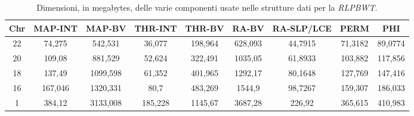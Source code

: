 \begin{table}
  \centering
  \caption{Dimensioni, in megabytes, delle varie componenti usate nelle
    strutture dati per la \textit{RLPBWT}.} 
  \label{tab:comp}
  \scriptsize
  \begin{tabular}{c||c|c|c|c|c|c|c|c}
    \hline
     Chr & MAP-INT & MAP-BV & THR-INT & THR-BV & RA-BV & RA-SLP/LCE & PERM & PHI \\ \hline
        22 & 74,275 & 542,531 & 36,077 & 198,964 & 628,093 & 44,7915 & 71,3182 & 89,0774 \\ \hline
        20 & 109,08 & 881,529 & 52,624 & 322,491 & 1035,05 & 61,8933 & 103,882 & 117,856 \\ \hline
        18 & 137,49 & 1099,598 & 61,352 & 401,965 & 1292,17 & 80,1648 & 127,769 & 147,416 \\ \hline
        16 & 167,046 & 1320,331 & 80,7 & 483,269 & 1544,9 & 98,7267 & 159,307 & 186,033 \\ \hline
        1 & 384,12 & 3133,008 & 185,228 & 1145,67 & 3687,28 & 226,92 & 365,615 & 410,983 \\ \hline
    \end{tabular}
\end{table}
